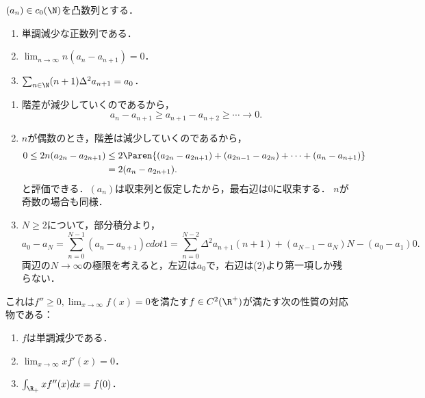 \documentclass[uplatex,dvipdfmx]{jsreport}
\begin{document}
\begin{lemma}[凸数列は単調減少する]
    $(a_n)\in c_0(\N)$を凸数列とする．
    \begin{enumerate}
        \item 単調減少な正数列である．
        \item $\lim_{n\to\infty}n(a_n-a_{n+1})=0$．
        \item $\sum_{n\in\N}(n+1)\Delta^2a_{n+1}=a_0$．
    \end{enumerate}
\end{lemma}
\begin{Proof}\mbox{}
    \begin{enumerate}
        \item 階差が減少していくのであるから，
        \[a_n-a_{n+1}\ge a_{n+1}-a_{n+2}\ge\cdots\to0.\]
        \item $n$が偶数のとき，階差は減少していくのであるから，
        \begin{align*}
            0\le 2n(a_{2n}-a_{2n+1})&\le 2\Paren{(a_{2n}-a_{2n+1})+(a_{2n-1}-a_{2n})+\cdots+(a_n-a_{n+1})}\\
            &=2(a_n-a_{2n+1}).
        \end{align*}
        と評価できる．$(a_n)$は収束列と仮定したから，最右辺は$0$に収束する．
        $n$が奇数の場合も同様．
        \item $N\ge2$について，部分積分より，
        \[a_0-a_N=\sum_{n=0}^{N-1}(a_n-a_{n+1})cdot1=\sum_{n=0}^{N-2}\Delta^2a_{n+1}(n+1)+(a_{N-1}-a_N)N-(a_0-a_1)0.\]
        両辺の$N\to\infty$の極限を考えると，左辺は$a_0$で，右辺は(2)より第一項しか残らない．
    \end{enumerate}
\end{Proof}
\begin{remarks}
    これは$f''\ge0,\lim_{x\to\infty}f(x)=0$を満たす$f\in C^2(\R^+)$が満たす次の性質の対応物である：
    \begin{enumerate}
        \item $f$は単調減少である．
        \item $\lim_{x\to\infty}xf'(x)=0$．
        \item $\int_{\R_+}xf''(x)dx=f(0)$．
    \end{enumerate}
\end{remarks}
\end{document}
